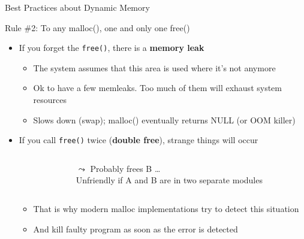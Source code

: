 \begin{frame}{Best Practices about Dynamic Memory}
  \begin{block}{\alert{Rule \#2:} To any malloc(), one and only one free()}
    \begin{itemize}

    \item If you forget the \texttt{free()}, there is a \textbf{\alert{memory leak}}
      \begin{itemize}
      \item The system assumes that this area is used where it's not anymore
      \item Ok to have a few memleaks. Too much of them will exhaust system resources
      \item Slows down (swap); malloc() eventually returns
        NULL (or OOM killer)
      \end{itemize}

    \item If you call \texttt{free()} twice (\textbf{\alert{double free}}), strange things will occur

      \begin{columns}
        \begin{column}{.26\linewidth}
          \begin{center}
          \end{center}
        \end{column}
        \begin{column}{.7\linewidth}
          $\leadsto$ Probably frees B \ldots\\
          Unfriendly if A and B are in two separate modules
        \end{column}
      \end{columns}

      \begin{itemize}
      \item That is why modern malloc implementations try to detect this situation
      \item And kill faulty program as soon as the error is detected
      \end{itemize}
    \end{itemize}


  \end{block}
\end{frame}
